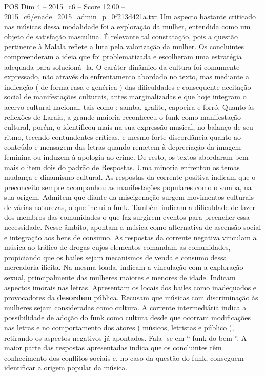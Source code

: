 \begin{textsample}{POS Dim 4 – 2015\_c6 – Score 12.00 – 2015\_c6/enade\_2015\_admin\_p\_0f213d421a.txt}
Um aspecto bastante criticado nas músicas dessa modalidade foi a exploração da mulher, entendida como um objeto de satisfação masculina.
É relevante tal constatação, pois a questão pertinente à Malala reflete a luta pela valorização da mulher.
Os concluintes compreenderam a ideia que foi problematizada e escolheram uma estratégia adequada para solucioná -la.
O caráter dinâmico da cultura foi comumente expressado, não através do enfrentamento abordado no texto, mas mediante a indicação ( de forma rasa e genérica ) das dificuldades e consequente aceitação social de manifestações culturais, antes marginalizadas e que hoje integram o acervo cultural nacional, tais como : samba, grafite, capoeira e forró.
Quanto às reflexões de Laraia, a grande maioria reconheceu o funk como manifestação cultural, porém, o identificou mais na sua expressão musical, no balanço de seu ritmo, tecendo contundentes críticas, e mesmo forte discordância quanto ao conteúdo e mensagem das letras quando remetem à depreciação da imagem feminina ou induzem à apologia ao crime.
De resto, os textos abordaram bem mais o item dois do padrão de Respostas.
Uma minoria enfrentou os temas mudança e dinamismo cultural.
As respostas da corrente positiva indicam que o preconceito sempre acompanhou as manifestações populares como o samba, na sua origem.
Admitem que diante da miscigenação surgem movimentos culturais de várias naturezas, o que inclui o funk.
Também indicam a dificuldade de lazer dos membros das comunidades o que faz surgirem eventos para preencher essa necessidade.
Nesse âmbito, apontam a música como alternativa de ascensão social e integração aos bens de consumo.
As respostas da corrente negativa vinculam a música ao tráfico de drogas cujos elementos comandam as comunidades, propiciando que os bailes sejam mecanismos de venda e consumo dessa mercadoria ilícita.
Na mesma toada, indicam a vinculação com a exploração sexual, principalmente das mulheres maiores e menores de idade.
Indicam aspectos imorais nas letras.
Apresentam os locais dos bailes como inadequados e provocadores da \textbf{desordem} pública.
Recusam que músicas com discriminação às mulheres sejam consideradas como cultura.
A corrente intermediária indica a possibilidade de adoção do funk como cultura desde que ocorram modificações nas letras e no comportamento dos atores ( músicos, letristas e público ), retirando os aspectos negativos já apontados.
Fala -se em “ funk do bem ”.
A maior parte das respostas apresentadas indica que os concluintes têm conhecimento dos conflitos sociais e, no caso da questão do funk, conseguem identificar a origem popular da música.

\end{textsample}
